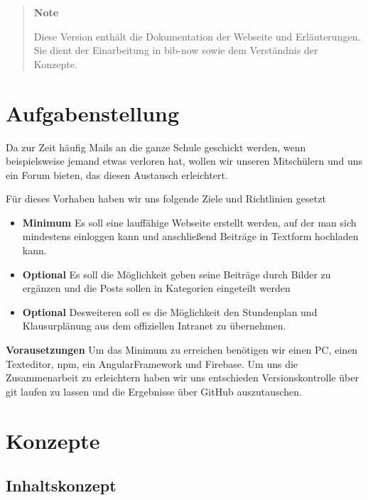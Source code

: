 \documentclass[12pt,titlepage]{article}
\begin{document}
\vspace{2cm}

\begin{quote}
\textbf{Note}

Diese Version enthält die Dokumentation der Webseite und Erläuterungen. Sie dient
der Einarbeitung in bib-now sowie dem Verständnis der Konzepte. 
\end{quote}

\pagebreak

\section{Aufgabenstellung}


Da zur Zeit häufig Mails an die ganze Schule geschickt werden, wenn beispielsweise jemand etwas verloren hat, wollen wir unseren Mitschülern und uns ein Forum bieten, das diesen Austausch erleichtert.

Für dieses Vorhaben haben wir uns folgende Ziele und Richtlinien gesetzt

\begin{itemize}
\item
\textbf{Minimum}
  Es soll eine lauffähige Webseite erstellt werden, auf der man sich mindestens einloggen kann und anschließend Beiträge in Textform hochladen kann. 
\item
\textbf{Optional}
  Es soll die Möglichkeit geben seine Beiträge durch Bilder zu ergänzen und die Posts sollen in Kategorien eingeteilt werden
\item
\textbf{Optional}
Desweiteren soll es die Möglichkeit den Stundenplan und Klausurplänung aus dem offiziellen Intranet zu übernehmen.

\end{itemize}


\textbf{Vorausetzungen}
Um das Minimum zu erreichen benötigen wir einen PC, einen Texteditor, npm, ein AngularFramework und Firebase. Um uns die Zusammenarbeit zu erleichtern haben wir uns entschieden Versionskontrolle über git laufen zu lassen und die Ergebnisse über GitHub auszutauschen. 

\newpage
\section{Konzepte}

\subsection{Inhaltskonzept}
\end{document}
